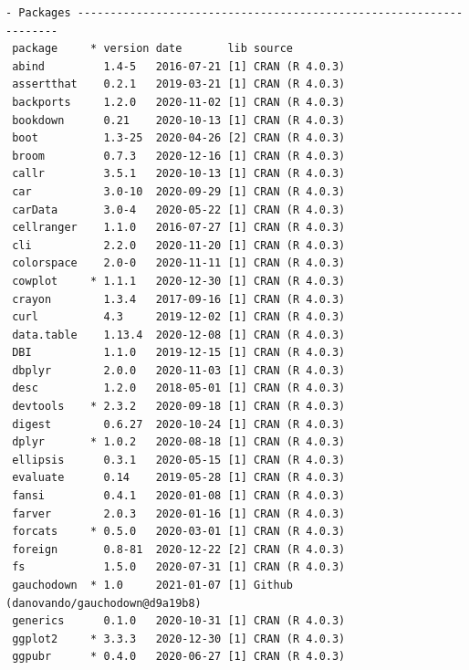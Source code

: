 \documentclass[twoside,12pt,final]{ucthesis-CA2012}
\begin{document}
\begin{ucmainmatter}
\begin{verbatim}
- Packages -------------------------------------------------------------------
 package     * version date       lib source                               
 abind         1.4-5   2016-07-21 [1] CRAN (R 4.0.3)                       
 assertthat    0.2.1   2019-03-21 [1] CRAN (R 4.0.3)                       
 backports     1.2.0   2020-11-02 [1] CRAN (R 4.0.3)                       
 bookdown      0.21    2020-10-13 [1] CRAN (R 4.0.3)                       
 boot          1.3-25  2020-04-26 [2] CRAN (R 4.0.3)                       
 broom         0.7.3   2020-12-16 [1] CRAN (R 4.0.3)                       
 callr         3.5.1   2020-10-13 [1] CRAN (R 4.0.3)                       
 car           3.0-10  2020-09-29 [1] CRAN (R 4.0.3)                       
 carData       3.0-4   2020-05-22 [1] CRAN (R 4.0.3)                       
 cellranger    1.1.0   2016-07-27 [1] CRAN (R 4.0.3)                       
 cli           2.2.0   2020-11-20 [1] CRAN (R 4.0.3)                       
 colorspace    2.0-0   2020-11-11 [1] CRAN (R 4.0.3)                       
 cowplot     * 1.1.1   2020-12-30 [1] CRAN (R 4.0.3)                       
 crayon        1.3.4   2017-09-16 [1] CRAN (R 4.0.3)                       
 curl          4.3     2019-12-02 [1] CRAN (R 4.0.3)                       
 data.table    1.13.4  2020-12-08 [1] CRAN (R 4.0.3)                       
 DBI           1.1.0   2019-12-15 [1] CRAN (R 4.0.3)                       
 dbplyr        2.0.0   2020-11-03 [1] CRAN (R 4.0.3)                       
 desc          1.2.0   2018-05-01 [1] CRAN (R 4.0.3)                       
 devtools    * 2.3.2   2020-09-18 [1] CRAN (R 4.0.3)                       
 digest        0.6.27  2020-10-24 [1] CRAN (R 4.0.3)                       
 dplyr       * 1.0.2   2020-08-18 [1] CRAN (R 4.0.3)                       
 ellipsis      0.3.1   2020-05-15 [1] CRAN (R 4.0.3)                       
 evaluate      0.14    2019-05-28 [1] CRAN (R 4.0.3)                       
 fansi         0.4.1   2020-01-08 [1] CRAN (R 4.0.3)                       
 farver        2.0.3   2020-01-16 [1] CRAN (R 4.0.3)                       
 forcats     * 0.5.0   2020-03-01 [1] CRAN (R 4.0.3)                       
 foreign       0.8-81  2020-12-22 [2] CRAN (R 4.0.3)                       
 fs            1.5.0   2020-07-31 [1] CRAN (R 4.0.3)                       
 gauchodown  * 1.0     2021-01-07 [1] Github (danovando/gauchodown@d9a19b8)
 generics      0.1.0   2020-10-31 [1] CRAN (R 4.0.3)                       
 ggplot2     * 3.3.3   2020-12-30 [1] CRAN (R 4.0.3)                       
 ggpubr      * 0.4.0   2020-06-27 [1] CRAN (R 4.0.3)                       

\end{verbatim}
\end{ucmainmatter}
\end{document}
